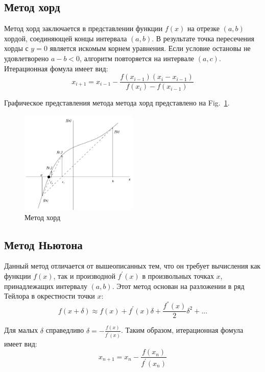 \documentclass[
11pt,%
tightenlines,%
twoside,%
onecolumn,%
nofloats,%
nobibnotes,%
nofootinbib,%
superscriptaddress,%
noshowpacs,%
centertags]%
{revtex4}
\begin{document}
\subsection{Метод хорд}
Метод хорд заключается в представлении функции $f(x)$ на отрезке $(a, b)$ хордой, соединяющей концы интервала $(a,b)$. В результате точка пересечения хорды с $y=0$ является искомым корнем уравнения. Если условие остановы не удовлетворено $a-b<0$, алгоритм повторяется на интервале $(a,c)$. 
Итерационная фомула имеет вид:
\begin{equation}
x_{i+1}=x_{i-1}-\frac{f(x_{i-1})(x_i-x_{i-1})}{f(x_i)-f(x_{i-1})}
\end{equation}


Графическое представления метода метода хорд представлено на Fig.~\ref{fig:chords}.

\begin{figure}[h]
\setcaptionmargin{5mm}
\onelinecaptionstrue
\includegraphics[width=0.5\textwidth]{pics/chords.png}
\caption{Метод хорд}\label{fig:chords}
\end{figure}

\subsection{Метод Ньютона}
Данный метод отличается от вышеописанных тем, что он требует вычисления как функции $f(x)$, так и производной $f^{'}(x)$ в произвольных точках $x$, принадлежащих интервалу $(a, b)$. Этот метод основан на разложении в ряд Тейлора в окрестности точки $x$:
\begin{equation}
f(x+\delta) \approx f(x)+f^{'}(x)\delta+\frac{f^{''}(x)}{2}\delta^2+ ...
\end{equation}

Для малых $\delta$ справедливо $\delta=-\frac{f(x)}{f^{'}(x)}$.
Таким образом, итерационная фомула имеет вид:
\begin{equation}
x_{n+1}=x_n-\frac{f(x_n)}{f^{'}(x_n)}
\end{equation}
\end{document}
